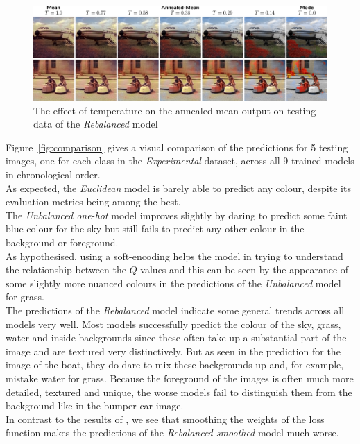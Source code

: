 \documentclass{article}
\begin{document}
\begin{figure}
    \centering
    \includegraphics[width=\textwidth]{GRAPHS/temperature.png}
    \caption{The effect of temperature on the annealed-mean output on testing data of the \textit{Rebalanced} model}
    \label{fig:temperature}
\end{figure}

Figure~\ref{fig:comparison} gives a visual comparison of the predictions for 5 testing images, one for each class
in the \textit{Experimental} dataset, across all 9 trained models in chronological order.\\
As expected, the \textit{Euclidean} model is barely able to predict any colour, despite its
evaluation metrics being among the best.\\
The \textit{Unbalanced one-hot} model improves slightly by daring to predict some faint blue colour for the sky
but still fails to predict any other colour in the background or foreground.\\
As hypothesised, using a soft-encoding helps the model in trying to understand the relationship between
the $Q$-values and this can be seen by the appearance of some slightly more nuanced colours in the predictions
of the \textit{Unbalanced} model for grass.\\
The predictions of the \textit{Rebalanced} model indicate some general trends across all models very well.
Most models successfully predict the colour of the sky, grass, water and inside backgrounds since
these often take up a substantial part of the image and are textured very distinctively.
But as seen in the prediction for the image of the boat, they do dare to mix these backgrounds up and,
for example, mistake water for grass.
Because the foreground of the images is often much more detailed, textured and unique, the worse models
fail to distinguish them from the background like in the bumper car image.\\
In contrast to the results of \cite{colourful}, we see that smoothing the weights of the loss function
makes the predictions of the \textit{Rebalanced smoothed} model much worse.
\end{document}
